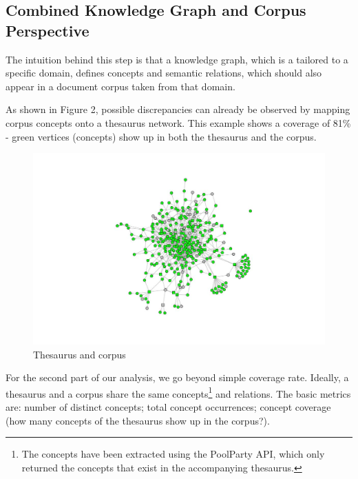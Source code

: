 \documentclass[runningheads,a4paper]{llncs}
\makeatletter
\def\maxwidth#1{\ifdim\Gin@nat@width>#1 #1\else\Gin@nat@width\fi}
\makeatother
\begin{document}
\subsection{Combined Knowledge Graph and Corpus Perspective }

The intuition behind this step is that a knowledge graph, which is a tailored to a specific domain, defines concepts and semantic relations, which should also appear in a document corpus taken from that domain.

As shown in Figure 2, possible discrepancies can already be observed by mapping corpus concepts onto a thesaurus network. This example shows a coverage of 81\% - green vertices (concepts) show up in both the thesaurus and the corpus.
\begin{figure}[h!]
\centering
\includegraphics[width=\maxwidth{\textwidth}]{./img/image2.jpg}
\cprotect\caption{Thesaurus and corpus}
\label{}
\end{figure}


For the second part of our analysis, we go beyond simple coverage rate. Ideally, a thesaurus and a corpus share the same concepts\footnote{ The concepts have been extracted using the PoolParty API, which only returned the concepts that exist in the accompanying thesaurus.} and relations. The basic metrics are: number of distinct concepts; total concept occurrences; concept coverage (how many concepts of the thesaurus show up in the corpus?).  
\end{document}
